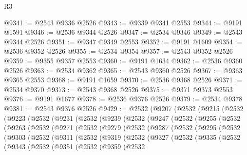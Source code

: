 \begin{lexlean}{R3}
\begin{coremodule}
@9341 := @2543 @9336 @2526
@9343 := @9339 @9341 @2553
@9344 := @9191 @1591
@9346 := @2536 @9344 @2526
@9347 := @2534 @9346
@9349 := @2543 @9344 @2526
@9351 := @9347 @9349 @2553
@9352 := @9191 @1609
@9354 := @2536 @9352 @2526
@9355 := @2534 @9354
@9357 := @2543 @9352 @2526
@9359 := @9355 @9357 @2553
@9360 := @9191 @1634
@9362 := @2536 @9360 @2526
@9363 := @2534 @9362
@9365 := @2543 @9360 @2526
@9367 := @9363 @9365 @2553
@9368 := @9191 @1659
@9370 := @2536 @9368 @2526
@9371 := @2534 @9370
@9373 := @2543 @9368 @2526
@9375 := @9371 @9373 @2553
@9376 := @9191 @1677
@9378 := @2536 @9376 @2526
@9379 := @2534 @9378
@9381 := @2543 @9376 @2526
@9429 := @2532
    (@9207
      (@2532
        (@9215
          (@2532
            (@9223
              (@2532
                (@9231
                  (@2532
                    (@9239
                      (@2532
                        (@9247
                          (@2532
                            (@9255
                              (@2532
                                (@9263
                                  (@2532
                                    (@9271
                                      (@2532
                                        (@9279
                                          (@2532
                                            (@9287
                                              (@2532
                                                (@9295
                                                  (@2532
                                                    (@9303
                                                      (@2532
                                                        (@9311
                                                          (@2532
                                                            (@9319
                                                              (@2532
                                                                (@9327
                                                                  (@2532
                                                                    (@9335
                                                                      (@2532
                                                                        (@9343
                                                                          (@2532
                                                                            (@9351
                                                                              (@2532
                                                                                (@9359
                                                                                  (@2532

\end{coremodule}
\end{lexlean}
